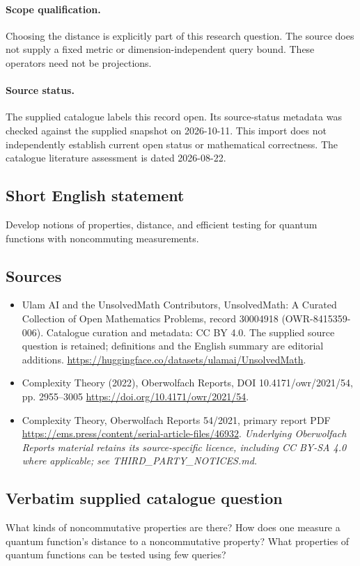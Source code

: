 \documentclass[11pt]{article}
\begin{document}
\paragraph{Scope qualification.}
Choosing the distance is explicitly part of this research question. The source does not supply a fixed metric or dimension-independent query bound. These operators need not be projections.
\paragraph{Source status.}
The supplied catalogue labels this record open. Its source-status metadata was checked against the supplied snapshot on 2026-10-11. This import does not independently establish current open status or mathematical correctness. The catalogue literature assessment is dated 2026-08-22.
\subsection{Short English statement}
Develop notions of properties, distance, and efficient testing for quantum functions with noncommuting measurements.
\subsection{Sources}
\begin{itemize}
\item[S1] Ulam AI and the UnsolvedMath Contributors, UnsolvedMath: A Curated Collection of Open Mathematics Problems, record 30004918 (OWR-8415359-006). Catalogue curation and metadata: CC BY 4.0. The supplied source question is retained; definitions and the English summary are editorial additions.
\url{https://huggingface.co/datasets/ulamai/UnsolvedMath}.
\item[S2] Complexity Theory (2022), Oberwolfach Reports, DOI 10.4171/owr/2021/54, pp. 2955--3005
\url{https://doi.org/10.4171/owr/2021/54}.
\item[S3] Complexity Theory, Oberwolfach Reports 54/2021, primary report PDF
\url{https://ems.press/content/serial-article-files/46932}.
\textit{Underlying Oberwolfach Reports material retains its source-specific licence, including CC BY-SA 4.0 where applicable; see THIRD\_PARTY\_NOTICES.md.}
\end{itemize}
\subsection{Verbatim supplied catalogue question}
What kinds of noncommutative properties are there? How does one measure a quantum function’s distance to a noncommutative property? What properties of quantum functions can be tested using few queries?
\end{document}
